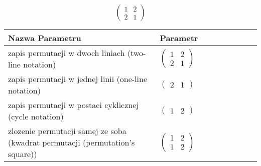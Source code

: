 \documentclass[12pt]{article}
\begin{document}
\subsection{}
\begin{center}
\[
\begin{pmatrix}
	1 & 2 \\ 
	2 & 1 
\end{pmatrix}
\]

\begin{tabular}{|m{0.6\linewidth}|m{0.4\linewidth}|}
	\hline
	Nazwa Parametru & Parametr \\
	\hline
	zapis permutacji w dwoch liniach (two-line notation) & $\begin{pmatrix} 1 & 2 \\ 
2 & 1 \end{pmatrix}$ \\ 
	\hline
	zapis permutacji w jednej linii (one-line notation) & $\begin{pmatrix} 2 & 1 \end{pmatrix}$ \\ 
	\hline
	zapis permutacji w postaci cyklicznej (cycle notation) & $\begin{pmatrix} 1 & 2 \end{pmatrix} $ \\ 
	\hline
	zlozenie permutacji samej ze soba (kwadrat permutacji (permutation's square)) & $\begin{pmatrix} 1 & 2 \\ 
1 & 2 \end{pmatrix}$ \\ 
	\hline
\end{tabular}
\end{center}
\end{document}
